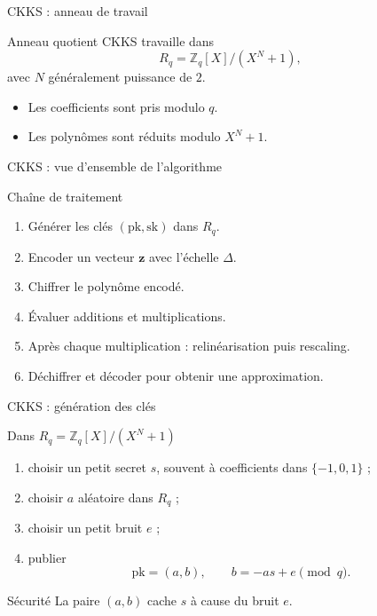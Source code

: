 \documentclass[10pt,aspectratio=169]{beamer}
\newcommand{\pk}{\mathrm{pk}}
\newcommand{\sk}{\mathrm{sk}}
\newcommand{\ZZ}{\mathbb{Z}}
\begin{document}
\begin{frame}{CKKS : anneau de travail}
  \begin{block}{Anneau quotient}
    CKKS travaille dans
    \[
      R_q=\ZZ_q[X]/(X^N+1),
    \]
    avec $N$ généralement puissance de $2$.
  \end{block}

  \begin{itemize}
    \item Les coefficients sont pris modulo $q$.
    \item Les polynômes sont réduits modulo $X^N+1$.
  \end{itemize}
\end{frame}


\begin{frame}{CKKS : vue d'ensemble de l'algorithme}
  \begin{block}{Chaîne de traitement}
    \begin{enumerate}
      \item Générer les clés $(\pk,\sk)$ dans $R_q$.
      \item Encoder un vecteur $\mathbf z$ avec l'échelle $\Delta$.
      \item Chiffrer le polynôme encodé.
      \item Évaluer additions et multiplications.
      \item Après chaque multiplication : relinéarisation puis rescaling.
      \item Déchiffrer et décoder pour obtenir une approximation.
    \end{enumerate}
  \end{block}
\end{frame}

\begin{frame}{CKKS : génération des clés}
  \begin{block}{Dans $R_q=\ZZ_q[X]/(X^N+1)$}
    \begin{enumerate}
      \item choisir un petit secret $s$, souvent à coefficients dans $\{-1,0,1\}$ ;
      \item choisir $a$ aléatoire dans $R_q$ ;
      \item choisir un petit bruit $e$ ;
      \item publier
      \[
        \pk=(a,b),\qquad b=-as+e\pmod q.
      \]
    \end{enumerate}
  \end{block}

  \begin{exampleblock}{Sécurité}
    La paire $(a,b)$ cache $s$ à cause du bruit $e$.
  \end{exampleblock}
\end{frame}
\end{document}
